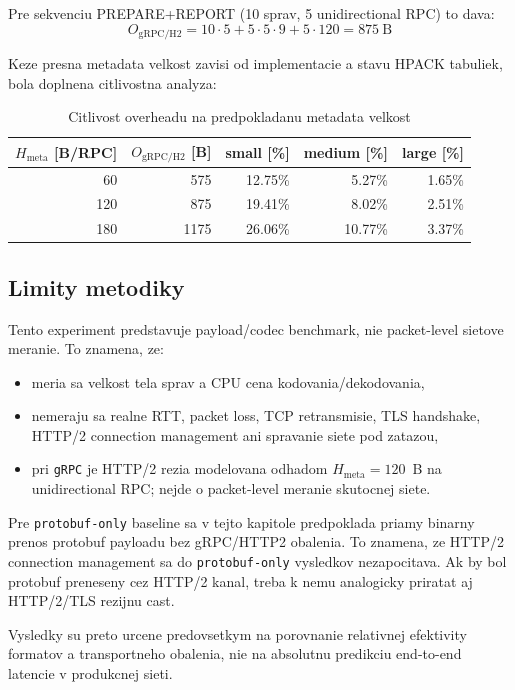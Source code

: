 \documentclass[12pt,a4paper]{report}
\begin{document}
Pre sekvenciu PREPARE+REPORT (10 sprav, 5 unidirectional RPC) to dava:
\begin{equation}
O_{\text{gRPC/H2}} = 10\cdot5 + 5\cdot5\cdot9 + 5\cdot120 = 875~\text{B}
\end{equation}

Keze presna metadata velkost zavisi od implementacie a stavu HPACK tabuliek,
bola doplnena citlivostna analyza:
\begin{table}[htbp]
\centering
\caption{Citlivost overheadu na predpokladanu metadata velkost}
\label{tab:grpc-http2-metadata-sensitivity}
\begin{tabular}{|r|r|r|r|r|}
\hline
$H_{\text{meta}}$ [B/RPC] & $O_{\text{gRPC/H2}}$ [B] & small [\%] & medium [\%] & large [\%] \\
\hline
60  & 575  & 12.75\% & 5.27\% & 1.65\% \\
120 & 875  & 19.41\% & 8.02\% & 2.51\% \\
180 & 1175 & 26.06\% & 10.77\% & 3.37\% \\
\hline
\end{tabular}
\end{table}

\subsection{Limity metodiky}

Tento experiment predstavuje payload/codec benchmark, nie packet-level
sietove meranie. To znamena, ze:
\begin{itemize}
  \item meria sa velkost tela sprav a CPU cena kodovania/dekodovania,
  \item nemeraju sa realne RTT, packet loss, TCP retransmisie, TLS handshake,
  HTTP/2 connection management ani spravanie siete pod zatazou,
  \item pri \texttt{gRPC} je HTTP/2 rezia modelovana odhadom
  $H_{\text{meta}}=120$~B na unidirectional RPC; nejde o packet-level meranie
  skutocnej siete.
\end{itemize}

Pre \texttt{protobuf-only} baseline sa v tejto kapitole predpoklada
priamy binarny prenos protobuf payloadu bez gRPC/HTTP2 obalenia.
To znamena, ze HTTP/2 connection management sa do \texttt{protobuf-only}
vysledkov nezapocitava. Ak by bol protobuf preneseny cez HTTP/2 kanal,
treba k nemu analogicky priratat aj HTTP/2/TLS rezijnu cast.

Vysledky su preto urcene predovsetkym na porovnanie relativnej efektivity
formatov a transportneho obalenia, nie na absolutnu predikciu end-to-end
latencie v produkcnej sieti.
\end{document}
